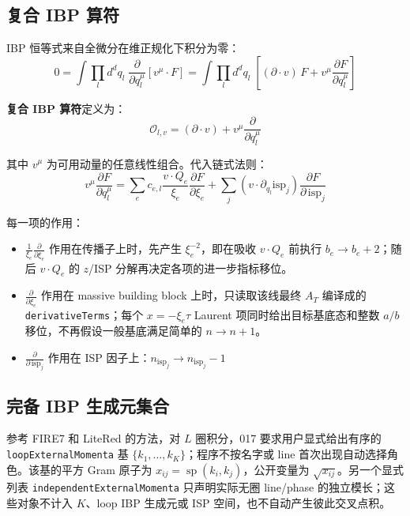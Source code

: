﻿\documentclass[a4paper,11pt]{article}
\begin{document}
\subsection{复合 IBP 算符}

IBP 恒等式来自全微分在维正规化下积分为零：
\begin{equation}
  0 = \int \prod_l d^d q_l\; \frac{\partial}{\partial q_l^\mu} \left[ v^\mu \cdot F \right] = \int \prod_l d^d q_l\; \left[ (\partial \cdot v)\, F + v^\mu \frac{\partial F}{\partial q_l^\mu} \right]
\end{equation}

\textbf{复合 IBP 算符}定义为：
\begin{equation}
  \mathcal{O}_{l,v} = (\partial \cdot v) + v^\mu \frac{\partial}{\partial q_l^\mu}
\end{equation}

其中 $v^\mu$ 为可用动量的任意线性组合。代入链式法则：
\begin{equation}
  v^\mu \frac{\partial F}{\partial q_l^\mu} = \sum_e c_{e,l} \frac{v \cdot Q_e}{\xi_e} \frac{\partial F}{\partial \xi_e} + \sum_j (v \cdot \partial_{q_l} \text{isp}_j) \frac{\partial F}{\partial\, \text{isp}_j}
\end{equation}

每一项的作用：
\begin{itemize}
  \item $\frac{1}{\xi_e}\frac{\partial}{\partial \xi_e}$ 作用在传播子上时，先产生 $\xi_e^{-2}$，即在吸收 $v\cdot Q_e$ 前执行 $b_e\to b_e+2$；随后 $v\cdot Q_e$ 的 $z$/ISP 分解再决定各项的进一步指标移位。
  \item $\frac{\partial}{\partial \xi_e}$ 作用在 massive building block 上时，只读取该线最终 $A_T$ 编译成的 \texttt{derivativeTerms}；每个 $x=-\xi_e\tau$ Laurent 项同时给出目标基底态和整数 $a/b$ 移位，不再假设一般基底满足简单的 $n\to n+1$。
  \item $\frac{\partial}{\partial\, \text{isp}_j}$ 作用在 ISP 因子上：$n_{\text{isp}_j} \to n_{\text{isp}_j} - 1$
\end{itemize}

\subsection{完备 IBP 生成元集合}

参考 FIRE7 和 LiteRed 的方法，对 $L$ 圈积分，017 要求用户显式给出有序的 \texttt{loopExternalMomenta} 基 $\{k_1,\ldots,k_K\}$；程序不按名字或 line 首次出现自动选择角色。该基的平方 Gram 原子为 $x_{ij}=\operatorname{sp}(k_i,k_j)$，公开变量为 $\sqrt{x_{ij}}$。另一个显式列表 \texttt{independentExternalMomenta} 只声明实际无圈 line/phase 的独立模长；这些对象不计入 $K$、loop IBP 生成元或 ISP 空间，也不自动产生彼此交叉点积。
\end{document}
